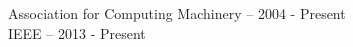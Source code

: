 \begin{center}
    Association for Computing Machinery -- 2004 - Present \\
    IEEE -- 2013 - Present
\end{center}
